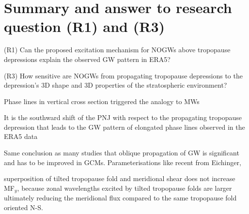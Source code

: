 
\section{Summary and answer to research question (R1) and (R3)}

\begin{tcolorbox}[]
    (R1) Can the proposed excitation mechanism for NOGWs above tropopause depressions explain the observed GW pattern in ERA5?
\end{tcolorbox}

\begin{tcolorbox}[]
    (R3) How sensitive are NOGWs from propagating tropopause depressions to the depression's 3D shape and 3D properties of the stratospheric environment?
\end{tcolorbox}

Phase lines in vertical cross section triggered the analogy to MWs

It is the southward shift of the PNJ with respect to the propagating tropopause depression that leads to the GW pattern of elongated phase lines observed in the ERA5 data %

Same conclusion as many studies that oblique propagation of GW is significant and has to be improved in GCMs. Parameterisations like recent from Eichinger, 

superposition of tilted tropopause fold and meridional shear does not increase MF$_y$, because zonal wavelengths excited by tilted tropopause folds are larger ultimately reducing the meridional flux compared to the same tropopause fold oriented N-S.


